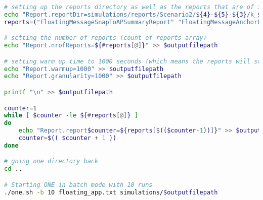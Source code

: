 \begin{lstlisting}[language=bash]
# setting up the reports directory as well as the reports that are of interest to us.
echo "Report.reportDir=simulations/reports/Scenario2/${4}-${5}-${3}/k_${2}/"$(date "+%Y-%m-%d %H%M%S") >> $outputfilepath
reports=("FloatingMessageSnapToAPSummaryReport" "FloatingMessageAnchorPointsReport")

# setting the number of reports (count of reports array)
echo "Report.nrofReports=${#reports[@]}" >> $outputfilepath

# setting warm up time to 1000 seconds (which means the reports will start recording after the 100th second)
echo "Report.warmup=1000" >> $outputfilepath
echo "Report.granularity=1000" >> $outputfilepath

printf "\n" >> $outputfilepath

counter=1
while [ $counter -le ${#reports[@]} ]
do
	echo "Report.report$counter=${reports[$(($counter-1))]}" >> $outputfilepath
	counter=$(( $counter + 1 ))
done

# going one directory back
cd ..

# Starting ONE in batch mode with 10 runs
./one.sh -b 10 floating_app.txt simulations/$outputfilepath

\end{lstlisting}
